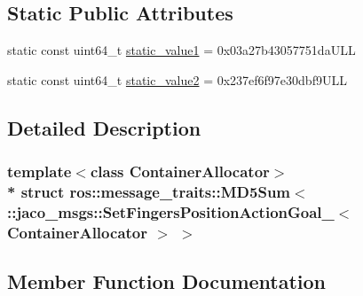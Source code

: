 \subsection*{Static Public Attributes}
\begin{DoxyCompactItemize}
\item 
static const uint64\+\_\+t \hyperlink{structros_1_1message__traits_1_1MD5Sum_3_01_1_1jaco__msgs_1_1SetFingersPositionActionGoal___3_01ContainerAllocator_01_4_01_4_a351636a09db0f63b9bfd394d20f6e8b7}{static\+\_\+value1} = 0x03a27b43057751da\+U\+LL
\item 
static const uint64\+\_\+t \hyperlink{structros_1_1message__traits_1_1MD5Sum_3_01_1_1jaco__msgs_1_1SetFingersPositionActionGoal___3_01ContainerAllocator_01_4_01_4_a9a1d9cd76b6b8356c10bc078d38191bd}{static\+\_\+value2} = 0x237ef6f97e30dbf9\+U\+LL
\end{DoxyCompactItemize}


\subsection{Detailed Description}
\subsubsection*{template$<$class Container\+Allocator$>$\\*
struct ros\+::message\+\_\+traits\+::\+M\+D5\+Sum$<$ \+::jaco\+\_\+msgs\+::\+Set\+Fingers\+Position\+Action\+Goal\+\_\+$<$ Container\+Allocator $>$ $>$}



\subsection{Member Function Documentation}

